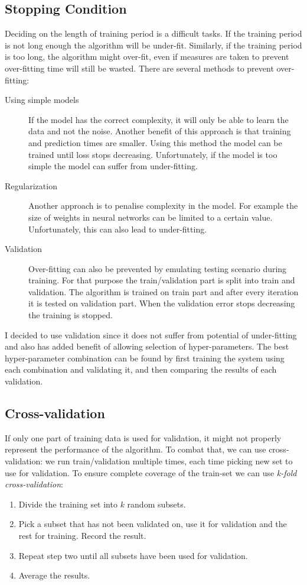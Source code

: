\documentclass[12pt,a4paper]{book}
\begin{document}
\subsection{Stopping Condition}
Deciding on the length of training period is a difficult tasks.
If the training period is not long enough the algorithm will be under-fit.
Similarly, if the training period is too long, the algorithm might over-fit, even if measures are taken to prevent over-fitting time will still be wasted.
There are several methods to prevent over-fitting:
\begin{description}
\item[Using simple models]
If the model has the correct complexity, it will only be able to learn the data and not the noise.
Another benefit of this approach is that training and prediction times are smaller.
Using this method the model can be trained until loss stops decreasing.
Unfortunately, if the model is too simple the model can suffer from under-fitting.

\item[Regularization]
Another approach is to penalise complexity in the model.
For example the size of weights in neural networks can be limited to a certain value.
Unfortunately, this can also lead to under-fitting.

\item[Validation] 
Over-fitting can also be prevented by emulating testing scenario during training.
For that purpose the train/validation part is split into train and validation.
The algorithm is trained on train part and after every iteration it is tested on validation part.
When the validation error stops decreasing the training is stopped.
\end{description}
I decided to use validation since it does not suffer from potential of under-fitting and also has added benefit of allowing selection of hyper-parameters.
The best hyper-parameter combination can be found by first training the system using each combination and validating it, and then comparing the results of each validation.

\subsection{Cross-validation}
If only one part of training data is used for validation, it might not properly represent the performance of the algorithm.
To combat that, we can use cross-validation: we run train/validation multiple times, each time picking new set to use for validation.
To ensure complete coverage of the train-set we can use \emph{k-fold cross-validation}: 
\begin{enumerate}
\item Divide the training set into $k$ random subsets.
\item Pick a subset that has not been validated on, use it for validation and the rest for training.
Record the result.
\item Repeat step two until all subsets have been used for validation.
\item Average the results.
\end{enumerate}
\end{document}
